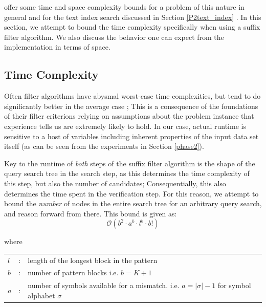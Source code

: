 \vali{} offer some time and space complexity bounds for a problem of this nature in general and for the \gls{text index} search discussed in Section \ref{P2text_index} \cite{vali2012}. In this section, we attempt to bound the time complexity specifically when using a \gls{suffix filter} algorithm. We also discuss the behavior one can expect from the implementation in terms of space.

\subsection{Time Complexity}
\label{time_complexity}



Often \glspl{filter algorithm} have abysmal worst-case time complexities, but tend to do significantly better in the average case \cite{kuch2014}; This is a consequence of the foundations of their \glspl{filter criterion} relying on assumptions about the problem instance that experience tells us are extremely likely to hold. In our case, actual runtime is sensitive to a host of variables including inherent properties of the input data set itself (as can be seen from the experiments in Section \ref{phase2}).

Key to the runtime of \textit{both} steps of the \gls{suffix filter} algorithm is the shape of the \gls{query} search tree in the \gls{search step}, as this determines the time complexity of this step, but also the number of candidates; Consequentially, this also determines the time spent in the \gls{verification step}. For this reason, we attempt to bound the \textit{number} of nodes in the entire search tree for an arbitrary \gls{query} search, and reason forward from there. This bound is given as:
$$\mathcal{O}(b^2 \cdot{} a^b \cdot{} l^b \cdot{} b!)$$

where\\


\vspace{-2mm}
\hspace{0.6cm}
\begin{tabular}{lcl}
$l $ &:& length of the longest block in the \gls{pattern}\\
$b $ &:& number of pattern blocks i.e. $b=K+1$\\
$a $ &:& \parbox[t]{8.3cm}{number of symbols available for a \gls{mismatch}. i.e. $a=|\sigma{}|-1$ for symbol alphabet $\sigma{}$}
 \end{tabular}
\\[3mm]

